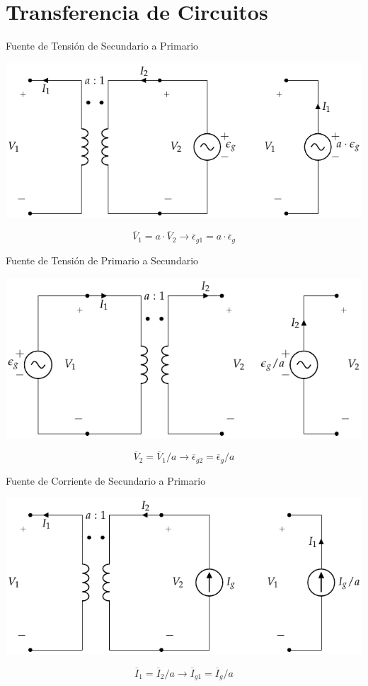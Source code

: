 \documentclass[xcolor={usenames,svgnames,dvipsnames}]{beamer}
\begin{document}
\section{Transferencia de Circuitos}
\label{sec:orge19d3d9}
\begin{frame}[label={sec:orgb01253f}]{Fuente de Tensión de Secundario a Primario}
\begin{center}
\includegraphics[width=.9\linewidth]{../figs/TrafoIdeal_VSec.pdf}
\end{center}

\[
  \overline{V}_1 = a \cdot \overline{V}_2 \rightarrow \boxed{\overline{\epsilon}_{g1} = a \cdot \overline{\epsilon}_g}
\]
\end{frame}
\begin{frame}[label={sec:orgc0f2aec}]{Fuente de Tensión de Primario a Secundario}
\begin{center}
\includegraphics[width=.9\linewidth]{../figs/TrafoIdeal_VPrim.pdf}
\end{center}

\[
  \overline{V}_2 = \overline{V}_1 / a \rightarrow \boxed{\overline{\epsilon}_{g2} = \overline{\epsilon}_g / a}
\]
\end{frame}
\begin{frame}[label={sec:org361efd4}]{Fuente de Corriente de Secundario a Primario}
\begin{center}
\includegraphics[width=.9\linewidth]{../figs/TrafoIdeal_ISec.pdf}
\end{center}

\[
  \overline{I}_1 = \overline{I}_2 / a \rightarrow \boxed{\overline{I}_{g1} = \overline{I}_g / a} 
\]
\end{frame}
\end{document}
